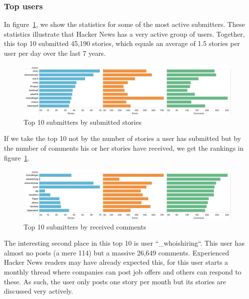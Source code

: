 \subsubsection{Top users}
In figure~\ref{fig:top10ByStories}, we show the statistics for some of the most active submitters. These statistics illustrate that Hacker News has a very active group of users. Together, this top 10 submitted 45,190 stories, which equals an average of 1.5 stories per user per day over the last 7 years.
\begin{figure}[ht!]
\caption{Top 10 submitters by submitted stories}
\label{fig:top10ByStories}
\centering
\includegraphics[width=12cm]{top10ByStories}
\end{figure}

If we take the top 10 not by the number of stories a user has submitted but by the number of comments his or her stories have received, we get the rankings in figure~\ref{fig:top10ByStories}.

\begin{figure}[ht!]
\caption{Top 10 submitters by received comments}
\label{fig:top10ByComments}
\centering
\includegraphics[width=12cm]{top10ByComments}
\end{figure}

The interesting second place in this top 10 is user ``\_whoishiring``. This user has almost no posts (a mere 114) but a massive 26,649 comments. Experienced Hacker News readers may have already expected this, for this user starts a monthly thread where companies can post job offers and others can respond to these. As such, the user only posts one story per month but its stories are discussed very actively.


